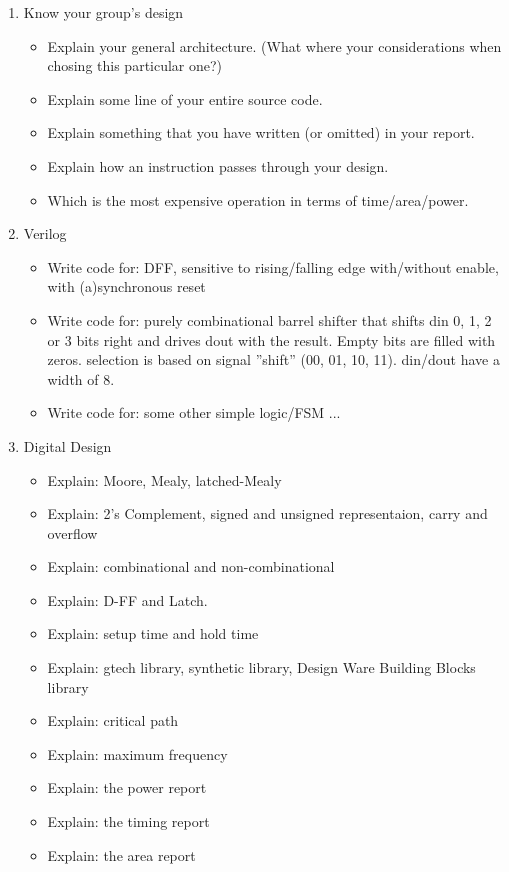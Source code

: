 \begin{enumerate}
		\item Know your group's design
			\begin{itemize}			
			\item Explain your general architecture. (What where your considerations when chosing this particular one?)
			\item Explain some line of your entire source code.
			\item Explain something that you have written (or omitted) in your report.
			\item Explain how an instruction passes through your design.
			\item Which is the most expensive operation in terms of time/area/power.
			\end{itemize}		
		\item Verilog
			\begin{itemize}			
			\item Write code for: DFF, sensitive to rising/falling edge with/without enable, with (a)synchronous reset
			\item Write code for: purely combinational barrel shifter that shifts din 0, 1, 2 or 3 bits right and drives dout with the result. Empty bits are filled with zeros. selection is based on signal ''shift'' (00, 01, 10, 11). din/dout have a width of 8.
			\item Write code for: some other simple logic/FSM ...	
			\end{itemize}	
		\item Digital Design
			\begin{itemize}
			\item Explain: Moore, Mealy, latched-Mealy
			\item Explain: 2's Complement, signed and unsigned representaion, carry and overflow
			\item Explain: combinational and non-combinational
			\item Explain: D-FF and Latch.
			\item Explain: setup time and hold time
			\item Explain: gtech library, synthetic library, Design Ware Building Blocks library
			\item Explain: critical path
			\item Explain: maximum frequency
			\item Explain: the power report
			\item Explain: the timing report
			\item Explain: the area report

\end{itemize}
\end{enumerate}

